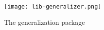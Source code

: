 \begin{figure}
    \centering
    \texttt{[image: lib-generalizer.png]}
    \caption{The generalization package}\label{fig:generalization_package}
\end{figure}
